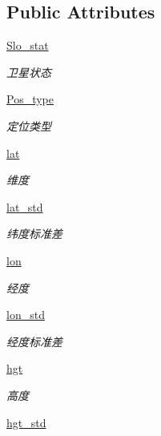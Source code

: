 \subsection*{Public Attributes}
\begin{DoxyCompactItemize}
\item 
\hyperlink{classserial__af__dox_1_1_g_p_s_a4e84a28fbee2bbaf0da4f050073aacc9}{Slo\+\_\+stat}
\begin{DoxyCompactList}\small\item\em 卫星状态 \end{DoxyCompactList}\item 
\hyperlink{classserial__af__dox_1_1_g_p_s_a043ee4c8affc3fce764d41ca497d91de}{Pos\+\_\+type}
\begin{DoxyCompactList}\small\item\em 定位类型 \end{DoxyCompactList}\item 
\hyperlink{classserial__af__dox_1_1_g_p_s_a0a36b2cc1064e37ac1e4e1ee74e73af2}{lat}
\begin{DoxyCompactList}\small\item\em 维度 \end{DoxyCompactList}\item 
\hyperlink{classserial__af__dox_1_1_g_p_s_a53c9e6de938a6b5e37c86c413af43378}{lat\+\_\+std}
\begin{DoxyCompactList}\small\item\em 纬度标准差 \end{DoxyCompactList}\item 
\hyperlink{classserial__af__dox_1_1_g_p_s_a8b43008e9e87340c07a77abf6a770ce8}{lon}
\begin{DoxyCompactList}\small\item\em 经度 \end{DoxyCompactList}\item 
\hyperlink{classserial__af__dox_1_1_g_p_s_a6bd9ed56c9274d1d18fa5140f61bb990}{lon\+\_\+std}
\begin{DoxyCompactList}\small\item\em 经度标准差 \end{DoxyCompactList}\item 
\hyperlink{classserial__af__dox_1_1_g_p_s_abc735f97cf9d1040a8caae8a92b07bc2}{hgt}
\begin{DoxyCompactList}\small\item\em 高度 \end{DoxyCompactList}\item 
\hyperlink{classserial__af__dox_1_1_g_p_s_a3d8d517a770d6e0406197b3d0088d77c}{hgt\+\_\+std}

\end{DoxyCompactItemize}
